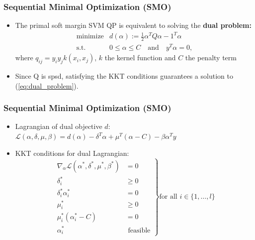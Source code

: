 \documentclass[12pt, compress]{beamer}
\newcommand{\titleC}{Sequential Minimal Optimization (SMO)}
\begin{document}
\begin{frame}
  \frametitle{\titleC}
  \begin{itemize}
  	\item The primal soft margin SVM QP is equivalent to solving the \textbf{\alert{dual problem:}}
  	\begin{eqnarray}\label{eq:dual_problem}
  	\text{minimize} & d(\alpha) := \frac{1}{2} \alpha^T Q \alpha - 1^T \alpha  \\ 
  	\nonumber
  	\text{s.t.} &  0 \leq \alpha \leq C  \quad \text{and} \quad 	y^T \alpha = 0,
  	\end{eqnarray}
  	where $q_{ij} = y_i y_j k(x_i,x_j)$, $k$ the kernel function and $C$ the penalty term
  	\item Since Q is spsd, satisfying the KKT conditions guarantees a solution to (\ref{eq:dual_problem}).
  \end{itemize}
\end{frame}

\begin{frame}
\frametitle{\titleC}
\begin{itemize}
	
	\item Lagrangian of dual objective $d$: $\mathcal{L}(\alpha,\delta,\mu,\beta) = d(\alpha) - \delta^T\alpha + \mu^T(\alpha - C) - \beta \alpha^T y$
	\item KKT conditions for dual Lagrangian:
	\begin{equation*}
	\left.
	\begin{aligned}
	\nabla_{\alpha} \mathcal{L}(\alpha^*,\delta^*,\mu^*,\beta^*) &= 0\\
	\delta_i^* &\geq 0\\
	\delta_i^* \alpha_i^* &= 0\\
	\mu_i^* &\geq 0\\
	\mu_i^* (\alpha_i^*-C) &= 0\\
	\alpha_i^* &\text{ feasible}
	\end{aligned}
	\right\} \text{for all } i \in \{1,\ldots,l\}
	\end{equation*}
\end{itemize}
\end{frame}
\end{document}
